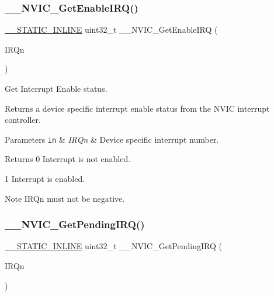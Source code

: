 \subsubsection{\texorpdfstring{\+\_\+\+\_\+\+N\+V\+I\+C\+\_\+\+Get\+Enable\+I\+R\+Q()}{\_\_NVIC\_GetEnableIRQ()}}
{\footnotesize\ttfamily \mbox{\hyperlink{cmsis__iccarm_8h_aba87361bfad2ae52cfe2f40c1a1dbf9c}{\+\_\+\+\_\+\+S\+T\+A\+T\+I\+C\+\_\+\+I\+N\+L\+I\+NE}} uint32\+\_\+t \+\_\+\+\_\+\+N\+V\+I\+C\+\_\+\+Get\+Enable\+I\+RQ (\begin{DoxyParamCaption}\item[{\mbox{\hyperlink{group___interrupt__vector__numbers_gac3af4a32370fb28c4ade8bf2add80251}{I\+R\+Qn\+\_\+\+Type}}}]{I\+R\+Qn }\end{DoxyParamCaption})}



Get Interrupt Enable status. 

Returns a device specific interrupt enable status from the N\+V\+IC interrupt controller. 
\begin{DoxyParams}[1]{Parameters}
\mbox{\tt in}  & {\em I\+R\+Qn} & Device specific interrupt number. \\
\hline
\end{DoxyParams}
\begin{DoxyReturn}{Returns}
0 Interrupt is not enabled. 

1 Interrupt is enabled. 
\end{DoxyReturn}
\begin{DoxyNote}{Note}
I\+R\+Qn must not be negative. 
\end{DoxyNote}
\mbox{\label{group___c_m_s_i_s___core___n_v_i_c_functions_ga5a92ca5fa801ad7adb92be7257ab9694}} 
\subsubsection{\texorpdfstring{\+\_\+\+\_\+\+N\+V\+I\+C\+\_\+\+Get\+Pending\+I\+R\+Q()}{\_\_NVIC\_GetPendingIRQ()}}
{\footnotesize\ttfamily \mbox{\hyperlink{cmsis__iccarm_8h_aba87361bfad2ae52cfe2f40c1a1dbf9c}{\+\_\+\+\_\+\+S\+T\+A\+T\+I\+C\+\_\+\+I\+N\+L\+I\+NE}} uint32\+\_\+t \+\_\+\+\_\+\+N\+V\+I\+C\+\_\+\+Get\+Pending\+I\+RQ (\begin{DoxyParamCaption}\item[{\mbox{\hyperlink{group___interrupt__vector__numbers_gac3af4a32370fb28c4ade8bf2add80251}{I\+R\+Qn\+\_\+\+Type}}}]{I\+R\+Qn }\end{DoxyParamCaption})}



